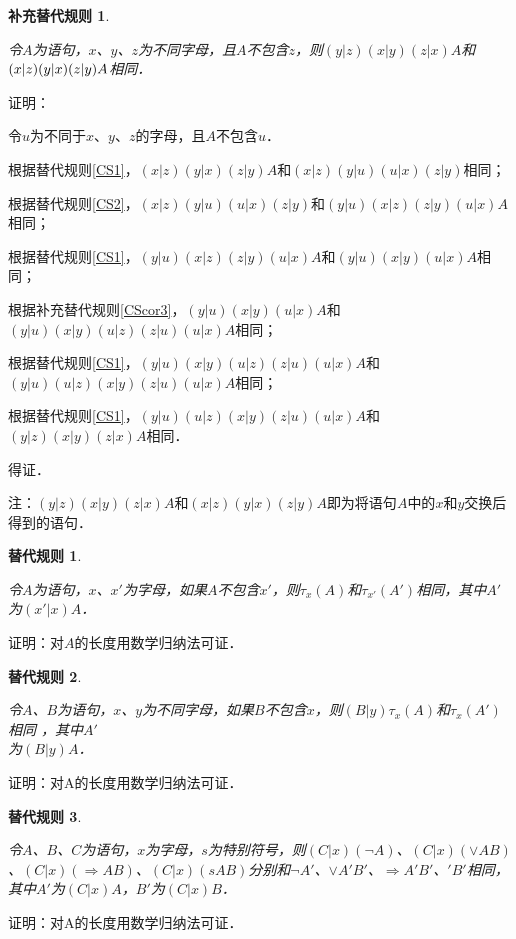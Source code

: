 \documentclass[12pt, a4paper, oneside]{book}
\newtheorem{CS}{替代规则}
\newtheorem{CScor}{补充替代规则}
\begin{document}
			\begin{CScor}\label{CScor4}
				\hfill\par
				令$A$为语句，$x$、$y$、$z$为不同字母，且$A$不包含$z$，则$(y|z)(x|y)(z|x)A$和$(x|z)(y|x)(z|y)\\A$相同．
			\end{CScor}		
			证明：
			\par
			令$u$为不同于$x$、$y$、$z$的字母，且$A$不包含$u$．
			\par
			根据替代规则\ref{CS1}，$(x|z)(y|x)(z|y)A$和$(x|z)(y|u)(u|x)(z|y)$相同；
			\par
			根据替代规则\ref{CS2}，$(x|z)(y|u)(u|x)(z|y)$和$(y|u)(x|z)(z|y)(u|x)A$相同；
			\par
			根据替代规则\ref{CS1}，$(y|u)(x|z)(z|y)(u|x)A$和$(y|u)(x|y)(u|x)A$相同；
			\par
			根据补充替代规则\ref{CScor3}，$(y|u)(x|y)(u|x)A$和$(y|u)(x|y)(u|z)(z|u)(u|x)A$相同；
			\par
			根据替代规则\ref{CS1}，$(y|u)(x|y)(u|z)(z|u)(u|x)A$和$(y|u)(u|z)(x|y)(z|u)(u|x)A$相同；
			\par
			根据替代规则\ref{CS1}，$(y|u)(u|z)(x|y)(z|u)(u|x)A$和$(y|z)(x|y)(z|x)A$相同．
			\par
			得证．
			\par
			注：$(y|z)(x|y)(z|x)A$和$(x|z)(y|x)(z|y)A$即为将语句$A$中的$x$和$y$交换后得到的语句．

			\begin{CS}\label{CS3}
				\hfill\par
				令$A$为语句，$x$、$x'$为字母，如果$A$不包含$x'$，则$\tau_x(A)$和$\tau_{x'}(A')$相同，其中$A'$为$(x'|x)A$．
			\end{CS}
			证明：对$A$的长度用数学归纳法可证．

			\begin{CS}\label{CS4}
				\hfill\par
				令$A$、$B$为语句，$x$、$y$为不同字母，如果$B$不包含$x$，则$(B|y)\tau_x(A)$和$\tau_x(A')$相同 ，其中$A'$\\为$(B|y)A$．
			\end{CS}
			证明：对A的长度用数学归纳法可证．

			\begin{CS}\label{CS5}
				\hfill\par
				令$A$、$B$、$C$为语句，$x$为字母，$s$为特别符号，则$(C|x)(\neg A)$、$(C|x)(\lor AB)$、$(C|x)(\Rightarrow AB)$、$(C|x)(sAB)$分别和$\neg A'$、$\lor A'B'$、$\Rightarrow A'B'$、$'B'$相同，其中$A'$为$(C|x)A$，$B'$为$(C|x)B$．
			\end{CS}
			证明：对A的长度用数学归纳法可证．
\end{document}

